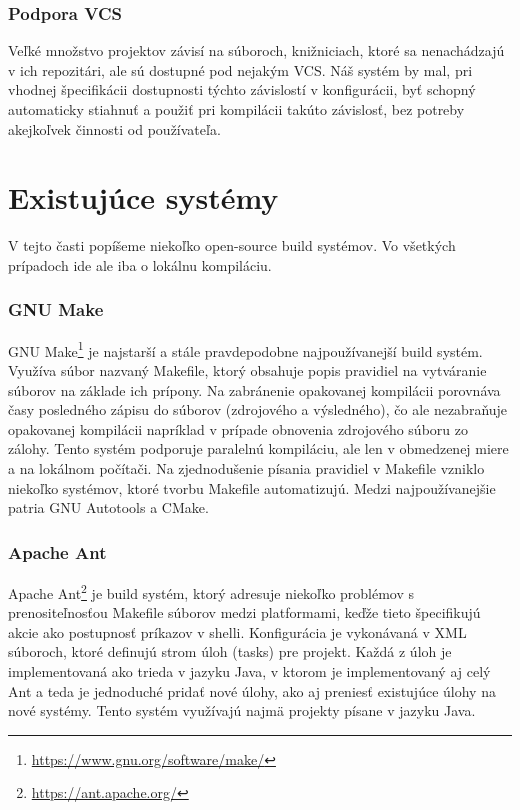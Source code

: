 \subsubsection{Podpora VCS}
Veľké množstvo projektov závisí na súboroch, knižniciach, ktoré sa nenachádzajú
v ich repozitári, ale sú dostupné pod nejakým VCS\@. Náš systém by mal, pri
vhodnej špecifikácii dostupnosti týchto závislostí v konfigurácii, byť schopný
automaticky stiahnuť a použiť pri kompilácii takúto závislosť, bez potreby akejkoľvek
činnosti od používateľa.

\section{Existuj\'{u}ce syst\'{e}my}
\label{sec:existing}
V tejto časti popíšeme niekoľko open-source build systémov. Vo všetkých prípadoch
ide ale iba o lokálnu kompiláciu.

\subsubsection{GNU Make}
GNU Make\footnote{\url{https://www.gnu.org/software/make/}} je najstarší a stále
pravdepodobne najpoužívanejší build systém. Využíva súbor nazvaný Makefile, ktorý
obsahuje popis pravidiel na vytváranie súborov na základe ich prípony. Na zabránenie
opakovanej kompilácii porovnáva časy posledného zápisu do súborov (zdrojového a
výsledného), čo ale nezabraňuje opakovanej kompilácii napríklad v prípade obnovenia
zdrojového súboru zo zálohy. Tento systém podporuje paralelnú kompiláciu, ale len
v obmedzenej miere a na lokálnom počítači. Na zjednodušenie písania pravidiel v Makefile
vzniklo niekoľko systémov, ktoré tvorbu Makefile automatizujú. Medzi najpoužívanejšie
patria GNU Autotools a CMake.

\subsubsection{Apache Ant}
Apache Ant\footnote{\url{https://ant.apache.org/}} je build systém, ktorý adresuje
niekoľko problémov s prenositeľnosťou Makefile súborov medzi platformami, keďže
tieto špecifikujú akcie ako postupnosť príkazov v shelli. Konfigurácia je vykonávaná
v XML súboroch, ktoré definujú strom úloh (tasks) pre projekt. Každá z úloh je
implementovaná ako trieda v jazyku Java, v ktorom je implementovaný aj celý Ant
a teda je jednoduché pridať nové úlohy, ako aj preniesť existujúce úlohy na nové
systémy. Tento systém využívajú najmä projekty písane v jazyku Java.

